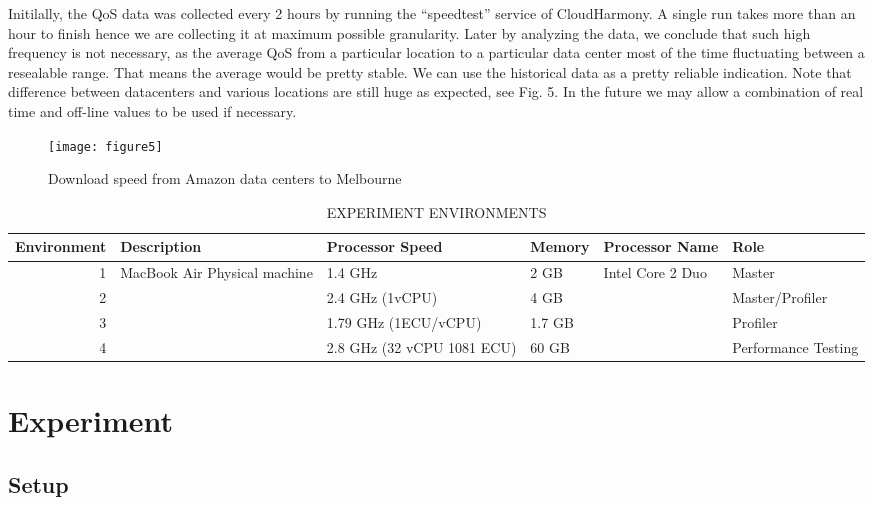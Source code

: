 \documentclass[journal]{IEEEtran}
\begin{document}
Initilally, the QoS data was collected every 2 hours by running the ``speedtest'' service of CloudHarmony. A single run takes more than an hour to finish hence we are collecting it at maximum possible granularity. Later by analyzing the data, we conclude that such high frequency is not necessary, as the average QoS from a particular location to a particular data center most of the time fluctuating between a resealable range. That means the average would be pretty stable. We can use the historical data as a pretty reliable indication. Note that difference between datacenters and various locations are still huge as expected, see Fig. 5. In the future we may allow a combination of real time and off-line values to be used if necessary.

\begin{figure}[!h]
 \centering
 \texttt{[image: figure5]}
 \caption{Download speed from Amazon data centers to Melbourne}
\label{fig5}
\end{figure}

\begin{table*}[!htp]
\begin{center}\caption{EXPERIMENT ENVIRONMENTS } \label{table:experiment_env}
\begin{tabular}{|r|l|l|l|l|l|}
\hline
\textbf{Environment}&  \textbf{Description } &  \textbf{Processor Speed }&  \textbf{Memory }&  \textbf{Processor Name }&  \textbf{Role }\\
\hline 1 &   MacBook Air Physical machine &    1.4 GHz &  2 GB &   Intel Core 2 Duo & Master  \\
\hline 2 &  &  
    2.4 GHz (1vCPU) 
     &  4 GB&  & Master/Profiler\\
\hline 3 &  &  
    1.79 GHz (1ECU/vCPU) 
     & 1.7 GB &  & Profiler\\
\hline 4 &  &  
 2.8 GHz (32 vCPU 1081 ECU)
     & 60 GB &  & Performance Testing \\

\hline
\end{tabular}
\end{center}
\end{table*}


\section{Experiment}\label{experiment}


\subsection{Setup}
\end{document}
